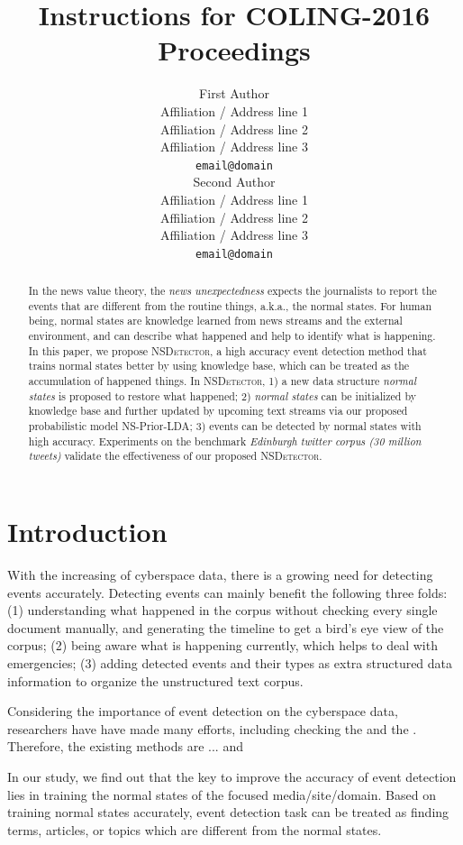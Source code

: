 \documentclass[11pt]{article}
\title{Instructions for COLING-2016 Proceedings}
\author{First Author \\
  Affiliation / Address line 1 \\
  Affiliation / Address line 2 \\
  Affiliation / Address line 3 \\
  {\tt email@domain} \\\And
  Second Author \\
  Affiliation / Address line 1 \\
  Affiliation / Address line 2 \\
  Affiliation / Address line 3 \\
  {\tt email@domain} \\}
\date{}
\begin{document}
\maketitle
\begin{abstract}
In the news value theory, the \textit{news unexpectedness} expects the journalists to report the events that are different from the routine things, a.k.a., the normal states. 
For human being, normal states are knowledge learned from news streams and the external environment, and can describe what happened and help to identify what is happening.
In this paper, we propose \textsc{NSDetector}, a high accuracy event detection method that trains normal states better by using knowledge base, which can be treated as the accumulation of happened things. 
In \textsc{NSDetector}, 1) a new data structure \textit{normal states} is proposed to restore what happened; 2) \textit{normal states} can be initialized by knowledge base and further updated by upcoming text streams via our proposed probabilistic model NS-Prior-LDA; 3) events can be detected by normal states with high accuracy.
Experiments on the benchmark \textit{Edinburgh twitter corpus (30 million tweets)} validate the effectiveness of our proposed \textsc{NSDetector}.
\end{abstract}

\section{Introduction}
\label{intro}

With the increasing of cyberspace data, there is a growing need for detecting events accurately. Detecting events can mainly benefit the following three folds: (1) understanding what happened in the corpus without checking every single document manually, and generating the timeline to get a bird's eye view of the corpus\cite{ge2015bring}; (2) being aware what is happening currently, which helps to deal with emergencies\cite{hughes2009twitter}\cite{sakaki2010earthquake}; (3) adding detected events and their types as extra structured data information to organize the unstructured text corpus\cite{ritter2012open}.  

Considering the importance of event detection on the cyberspace data, researchers have have made many efforts, including checking the and the . Therefore, the existing methods are ... and 

In our study, we find out that the key to improve the accuracy of event detection lies in training the normal states of the focused media/site/domain. Based on training normal states accurately, event detection task can be treated as finding terms, articles, or topics which are different from the normal states. 
\end{document}

